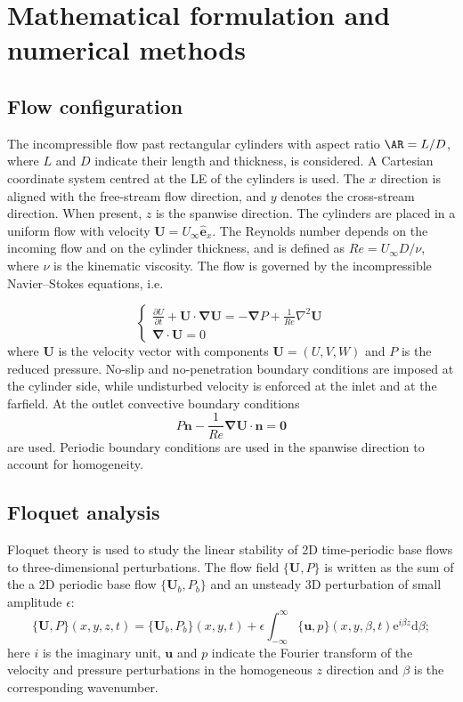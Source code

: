 \section{Mathematical formulation and numerical methods}
\label{sec:methods}

\subsection{Flow configuration}
The incompressible flow past rectangular cylinders with aspect ratio $\AR=L/D$, where $L$ and $D$ indicate their length and thickness, is considered. A Cartesian coordinate system centred at the LE of the cylinders is used. The $x$ direction is aligned with the free-stream flow direction, and $y$ denotes the cross-stream direction. When present, $z$ is the spanwise direction. The cylinders are placed in a uniform flow with velocity $\bm{U}=U_\infty\hat{\bm{e}}_x$. The Reynolds number depends on the incoming flow and on the cylinder thickness, and is defined as $Re= U_\infty D /\nu$, where $\nu$ is the kinematic viscosity. The flow is governed by the incompressible Navier--Stokes equations, i.e.
%

\begin{equation}
\begin{cases}
\frac{\partial U}{\partial t} + \bm{U} \cdot \bm{\nabla}\bm{U} = - \bm{\nabla} P + \frac{1}{Re} \nabla^2 \bm{U} \\
\bm{\nabla} \cdot \bm{U} = 0
\end{cases}
\label{eq:NSequations}
\end{equation}
%
where $\bm{U}$ is the velocity vector with components $\bm{U}=(U,V,W)$ and $P$ is the reduced pressure. No-slip and no-penetration boundary conditions are imposed at the cylinder side, while undisturbed velocity is enforced at the inlet and at the farfield. At the outlet convective boundary conditions
% 
\begin{equation*}
P \bm{n} - \frac{1}{Re} \bm{\nabla} \bm{U} \cdot \bm{n} = \bm{0}
\end{equation*}
%
are used. Periodic boundary conditions are used in the spanwise direction to account for homogeneity.

\subsection{Floquet analysis}

Floquet theory is used to study the linear stability of 2D time-periodic base flows to three-dimensional perturbations. The flow field $\{\bm{U},P\}$ is written as the sum of the a 2D periodic base flow $\{\bm{U}_b,P_b\}$ and an unsteady 3D perturbation of small amplitude $\epsilon$:
\begin{equation}
\{\bm{U},P\}(x,y,z,t) = \{\bm{U}_b,P_b\}(x,y,t) + \epsilon \int_{-\infty}^{\infty} \{\bm{u},p\}(x,y,\beta,t) \text{e}^{i \beta z} \text{d} \beta;
\end{equation}
here $i$ is the imaginary unit, $\bm{u}$ and $p$ indicate the Fourier transform of the velocity and pressure perturbations in the homogeneous $z$ direction and $\beta$ is the corresponding wavenumber.

